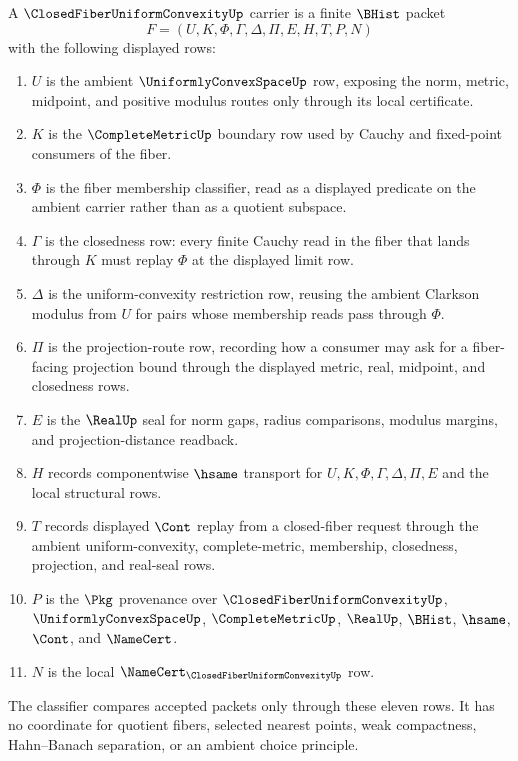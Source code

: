 \begin{definition}
\label{def:closed-fiber-uniform-convexity-carrier}
A $\ClosedFiberUniformConvexityUp$ carrier is a finite $\BHist$ packet
$$
F=(U,K,\Phi,\Gamma,\Delta,\Pi,E,H,T,P,N)
$$
with the following displayed rows:
\begin{enumerate}
\item $U$ is the ambient $\UniformlyConvexSpaceUp$ row, exposing the norm, metric, midpoint, and positive modulus routes only through its local certificate.
\item $K$ is the $\CompleteMetricUp$ boundary row used by Cauchy and fixed-point consumers of the fiber.
\item $\Phi$ is the fiber membership classifier, read as a displayed predicate on the ambient carrier rather than as a quotient subspace.
\item $\Gamma$ is the closedness row: every finite Cauchy read in the fiber that lands through $K$ must replay $\Phi$ at the displayed limit row.
\item $\Delta$ is the uniform-convexity restriction row, reusing the ambient Clarkson modulus from $U$ for pairs whose membership reads pass through $\Phi$.
\item $\Pi$ is the projection-route row, recording how a consumer may ask for a fiber-facing projection bound through the displayed metric, real, midpoint, and closedness rows.
\item $E$ is the $\RealUp$ seal for norm gaps, radius comparisons, modulus margins, and projection-distance readback.
\item $H$ records componentwise $\hsame$ transport for $U,K,\Phi,\Gamma,\Delta,\Pi,E$ and the local structural rows.
\item $T$ records displayed $\Cont$ replay from a closed-fiber request through the ambient uniform-convexity, complete-metric, membership, closedness, projection, and real-seal rows.
\item $P$ is the $\Pkg$ provenance over $\ClosedFiberUniformConvexityUp$, $\UniformlyConvexSpaceUp$, $\CompleteMetricUp$, $\RealUp$, $\BHist$, $\hsame$, $\Cont$, and $\NameCert$.
\item $N$ is the local $\NameCert_{\ClosedFiberUniformConvexityUp}$ row.
\end{enumerate}
The classifier compares accepted packets only through these eleven rows. It has no coordinate for quotient fibers, selected nearest points, weak compactness, Hahn--Banach separation, or an ambient choice principle.
\end{definition}

